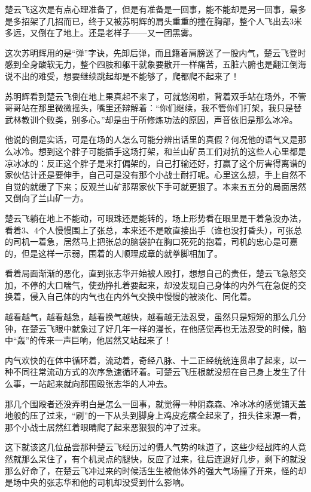 楚云飞这次是有点心理准备了，但是有准备是一回事，能不能却是另一回事，最多是多招架了几招而已，终于又被苏明辉的肩头重重的撞在胸部，整个人飞出去3米多远，又倒在了地上。还是老样子——又一团黑雾。

这次苏明辉用的是“弹”字诀，先卸后弹，而且籍着肩膀送了一股内气，楚云飞登时感到全身酸软无力，整个四肢和躯干就象要散开一样痛苦，五脏六腑也是翻江倒海说不出的难受，想要继续跳起却是不能够了，爬都爬不起来了！

苏明辉看到楚云飞倒在地上果真起不来了，可就悠闲啦，背着双手站在场外，不管哥哥站在那里微微摇头，嘴里还辩解着：“你们继续，我不管你们打架，我只是替武林教训个败类，别多心。”却是由于所修炼功法的原因，声音依旧是那么冰冷。

他说的倒是实话，可是在场的人怎么可能分辨出话里的真假？何况他的语气又是那么冰冷。想到这个胖子可能插手这场打架，和兰山矿员工们对抗的这些人心里都是凉冰冰的：反正这个胖子是来打偏架的，自己打输还好，打赢了这个厉害得离谱的家伙估计还是要伸手，自己可是没有那个小战士耐打呢。心里这么想，手上自然不自觉的就缓了下来；反观兰山矿那帮家伙下手可就更狠了。本来五五分的局面居然又倒向了兰山矿一方。

楚云飞躺在地上不能动，可眼珠还是能转的，场上形势看在眼里是干着急没办法，看着3、4个人慢慢围上了张总，本来还不是敢直接出手（谁也没打昏头），可张总的司机一着急，居然马上把张总的脑袋护在胸口死死的抱着，司机的忠心是可嘉的，但是这样一示弱，围着的人顺理成章的就拳脚相加了。

看着局面渐渐的恶化，直到张志华开始被人殴打，想想自己的责任，楚云飞急怒交加，不停的大口喘气，使劲挣扎着要起来，却没发现自己身体的内外气在急促的交换着，侵入自己体的内气也在内外气交换中慢慢的被淡化、同化着。

越看越气，越看越急，越看换气越快，越看越无法忍受，虽然只是短短的那么几分钟，在楚云飞眼中就象过了好几年一样的漫长，在他感觉再也无法忍受的时候，脑中“轰”的传来一声巨响，他居然又站起来了！

内气欢快的在体中循环着，流动着，奇经八脉、十二正经统统连贯串了起来，以一种不同往常流动方式的次序急速循环着。可楚云飞压根就没想在自己身上发生了什么事，一站起来就向那围殴张志华的人冲去。

那几个围殴者还没弄明白是怎么一回事，就觉得一种阴森森、冷冰冰的感觉铺天盖地般的压了过来，“刷”的一下从头到脚身上鸡皮疙瘩全起来了，扭头往来源一看，那个小战士居然红着眼睛爬了起来恶狠狠的冲了过来。

这下就该这几位品尝那种楚云飞经历过的慑人气势的味道了，这些少经战阵的人竟然就那么呆住了，有个机灵点的腿快，反应了过来，往后连退好几步，剩下的就没那么好命了，在楚云飞冲过来的时候活生生被他体外的强大气场撞了开来，怪的却是场中央的张志华和他的司机却没受到什么影响。

